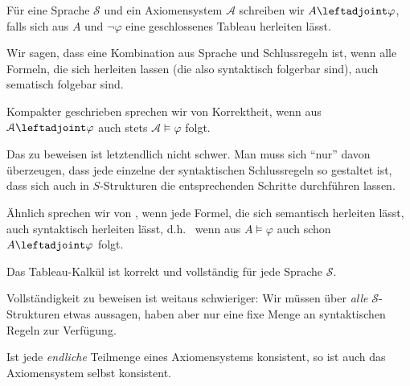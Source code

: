 \documentclass[ngerman]{scrartcl}
\def\shows{\leftadjoint}
\begin{document}
\begin{notation}
  Für eine Sprache $\mathcal{S}$ und ein Axiomensystem $\mathcal{A}$ schreiben wir
  $A \shows \varphi $, falls sich aus $A$ und $\lnot \varphi $ eine geschlossenes
  Tableau herleiten lässt.
\end{notation}

\begin{definition}[Korrektheit]
  Wir sagen, dass eine Kombination aus Sprache und Schlussregeln 
  ist, wenn alle Formeln, die sich herleiten lassen (die also syntaktisch folgerbar sind),
  auch sematisch folgebar sind.

  Kompakter geschrieben sprechen wir von Korrektheit, wenn aus $\mathcal{A} \shows \varphi $ auch stets $\mathcal{A} \models \varphi $ folgt.
\end{definition}

\begin{remark}
  Das zu beweisen ist letztendlich nicht schwer. Man muss sich \enquote{nur} davon überzeugen, dass jede einzelne der syntaktischen Schlussregeln so gestaltet ist,
  dass sich auch in $S$-Strukturen die entsprechenden Schritte durchführen lassen.
\end{remark}

\begin{definition}[Vollständigkeit]
  Ähnlich sprechen wir von , wenn jede Formel,
  die sich semantisch herleiten lässt, auch syntaktisch herleiten lässt,
  d.h.~ wenn aus $A \models \varphi $ auch schon $A \shows \varphi $ folgt.
\end{definition}

\begin{theorem}
  Das Tableau-Kalkül ist korrekt und vollständig für jede Sprache $\mathcal{S}$.
\end{theorem}

\begin{remark}
  Vollständigkeit zu beweisen ist weitaus schwieriger: Wir müssen über \emph{alle} $\mathcal{S}$-Strukturen etwas aussagen, haben aber nur eine fixe Menge an syntaktischen Regeln zur Verfügung.
\end{remark}

\begin{corollary}
  Ist jede \emph{endliche} Teilmenge eines Axiomensystems konsistent,
  so ist auch das Axiomensystem selbst konsistent.
\end{corollary}
\end{document}
